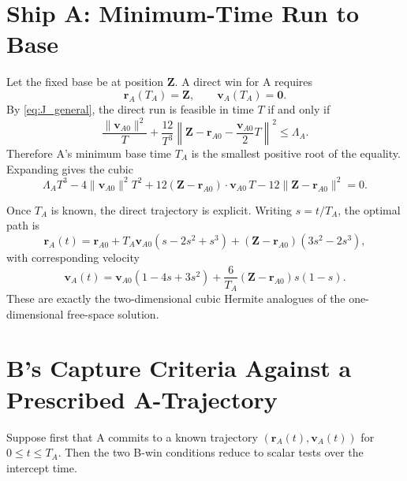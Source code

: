 \documentclass[journal, a4paper]{IEEEtran}
\begin{document}
\section{Ship A: Minimum-Time Run to Base}
Let the fixed base be at position $\mathbf Z$. A direct win for A requires
\begin{equation}
\mathbf r_A(T_A)=\mathbf Z,
\qquad
\mathbf v_A(T_A)=\mathbf 0.
\end{equation}
By \eqref{eq:J_general}, the direct run is feasible in time $T$ if and only if
\begin{equation}
\frac{\|\mathbf v_{A0}\|^2}{T}
+\frac{12}{T^3}
\left\|\mathbf Z-\mathbf r_{A0}-\frac{\mathbf v_{A0}}{2}T\right\|^2
\le \Lambda_A.
\label{eq:A_to_base_feasible}
\end{equation}
Therefore A's minimum base time $T_A$ is the smallest positive root of the equality. Expanding gives the cubic
\begin{equation}
\Lambda_A T^3
-4\|\mathbf v_{A0}\|^2 T^2
+12(\mathbf Z-\mathbf r_{A0})\cdot \mathbf v_{A0}\,T
-12\|\mathbf Z-\mathbf r_{A0}\|^2=0.
\label{eq:A_base_cubic}
\end{equation}

Once $T_A$ is known, the direct trajectory is explicit. Writing $s=t/T_A$, the optimal path is
\begin{equation}
\mathbf r_A(t)=
\mathbf r_{A0}
+T_A\mathbf v_{A0}(s-2s^2+s^3)
+(\mathbf Z-\mathbf r_{A0})(3s^2-2s^3),
\label{eq:A_base_path}
\end{equation}
with corresponding velocity
\begin{equation}
\mathbf v_A(t)=
\mathbf v_{A0}(1-4s+3s^2)
+\frac{6}{T_A}(\mathbf Z-\mathbf r_{A0})s(1-s).
\label{eq:A_base_velocity}
\end{equation}
These are exactly the two-dimensional cubic Hermite analogues of the one-dimensional free-space solution.

\section{B's Capture Criteria Against a Prescribed A-Trajectory}
Suppose first that A commits to a known trajectory $(\mathbf r_A(t),\mathbf v_A(t))$ for $0\le t\le T_A$. Then the two B-win conditions reduce to scalar tests over the intercept time.
\end{document}
